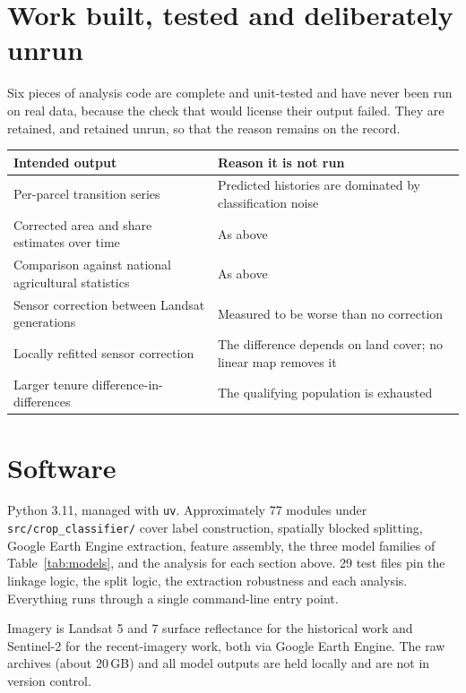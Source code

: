 \documentclass[11pt,a4paper]{article}
\begin{document}
\appendix
\section{Work built, tested and deliberately unrun}

Six pieces of analysis code are complete and unit-tested and have never been run on real data,
because the check that would license their output failed. They are retained, and retained unrun,
so that the reason remains on the record.

\begin{table}[htbp]
\centering
\small
\begin{tabular}{@{}p{6.0cm}p{8.4cm}@{}}
\toprule
\textbf{Intended output} & \textbf{Reason it is not run} \\
\midrule
Per-parcel transition series & Predicted histories are dominated by classification noise \\
Corrected area and share estimates over time & As above \\
Comparison against national agricultural statistics & As above \\
Sensor correction between Landsat generations & Measured to be worse than no correction \\
Locally refitted sensor correction & The difference depends on land cover; no linear map removes it \\
Larger tenure difference-in-differences & The qualifying population is exhausted \\
\bottomrule
\end{tabular}
\end{table}

\section{Software}

Python 3.11, managed with \texttt{uv}. Approximately 77 modules under
\texttt{src/crop\_classifier/} cover label construction, spatially blocked splitting, Google Earth
Engine extraction, feature assembly, the three model families of Table~\ref{tab:models}, and the
analysis for each section above. 29 test files pin the linkage logic, the split logic, the
extraction robustness and each analysis. Everything runs through a single command-line entry
point.

Imagery is Landsat 5 and 7 surface reflectance for the historical work and Sentinel-2 for the
recent-imagery work, both via Google Earth Engine. The raw archives (about 20\,GB) and all model
outputs are held locally and are not in version control.
\end{document}
